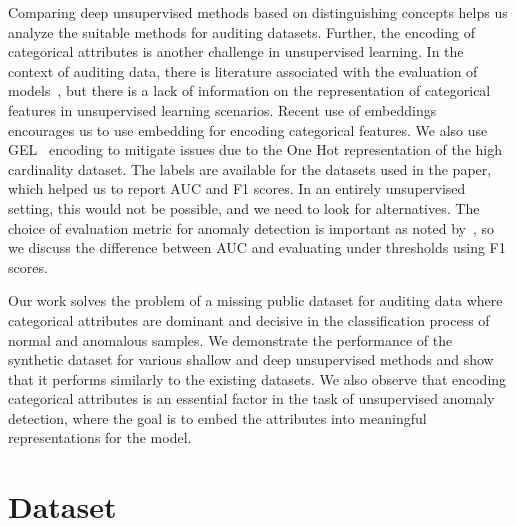 \documentclass{article}
\begin{document}
Comparing deep unsupervised methods based on distinguishing concepts helps us analyze the suitable methods for auditing datasets. Further, the encoding of categorical attributes is another challenge in unsupervised learning. In the context of auditing data, there is literature associated with the evaluation of models~\citep{auditing2, auditing3}, but there is a lack of information on the representation of categorical features in unsupervised learning scenarios. Recent use of embeddings~\citep{embed3, entityembed, embed2} encourages us to use embedding for encoding categorical features. We also use GEL~\citep{gel} encoding to mitigate issues due to the One Hot representation of the high cardinality dataset. The labels are available for the datasets used in the paper, which helped us to report AUC and F1 scores. In an entirely unsupervised setting, this would not be possible, and we need to look for alternatives. The choice of evaluation metric for anomaly detection is important as noted by~\citep{recent2022}, so we discuss the difference between AUC and evaluating under thresholds using F1 scores. 

Our work solves the problem of a missing public dataset for auditing data where categorical attributes are dominant and decisive in the classification process of normal and anomalous samples. We demonstrate the performance of the synthetic dataset for various shallow and deep unsupervised methods and show that it performs similarly to the existing datasets. We also observe that encoding categorical attributes is an essential factor in the task of unsupervised anomaly detection, where the goal is to embed the attributes into meaningful representations for the model.

\section{Dataset}
\end{document}
